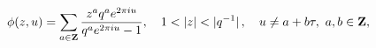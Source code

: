 \begin{equation}
\phi(z,u)=\sum_{a\in{\bf Z}} \frac{z^a q^a e^{2\pi i  u } }
{q^a e^{2\pi i  u }-1}, \quad 1<|z|<|q^{-1}|\,, \quad u\neq
a+b\tau,~
a,b\in{\bf Z},
\label{Ser1}
\end{equation}

